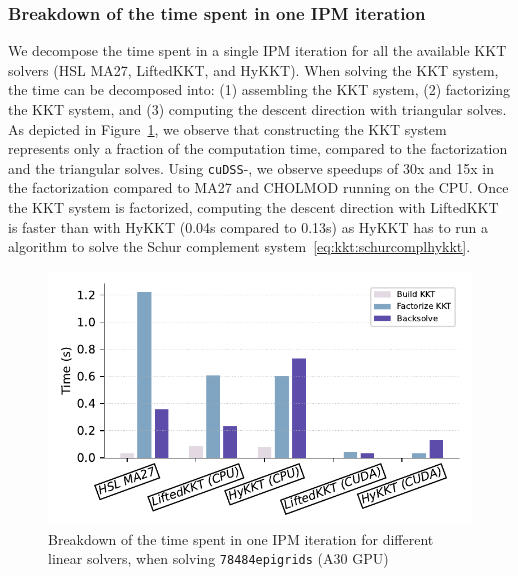 \subsubsection{Breakdown of the time spent in one IPM iteration}
We decompose the time spent in a single
IPM iteration for all the available KKT solvers (HSL MA27, LiftedKKT, and HyKKT).
When solving the KKT system, the time can be decomposed into: (1) assembling the
KKT system, (2) factorizing the KKT system, and (3) computing the descent direction with triangular solves.
As depicted in Figure~\ref{fig:timebreakdown}, we observe
that constructing the KKT system represents only a fraction of the computation time, compared
to the factorization and the triangular solves. Using {\tt cuDSS}-\ldlt, we observe speedups of
30x and 15x in the factorization compared to MA27 and CHOLMOD running on the CPU.
Once the KKT system is factorized, computing the descent direction with LiftedKKT is faster than with HyKKT
(0.04s compared to 0.13s) as HyKKT has to run a \CG algorithm to solve the Schur complement
system~\eqref{eq:kkt:schurcomplhykkt}.

\begin{figure}[!ht]
  \centering
  \includegraphics[width=.7\textwidth]{../figures/breakdown.pdf}
  \caption{Breakdown of the time spent in one IPM iteration
    for different linear solvers, when solving {\tt 78484epigrids} (A30 GPU)
  \label{fig:timebreakdown}}
\end{figure}



